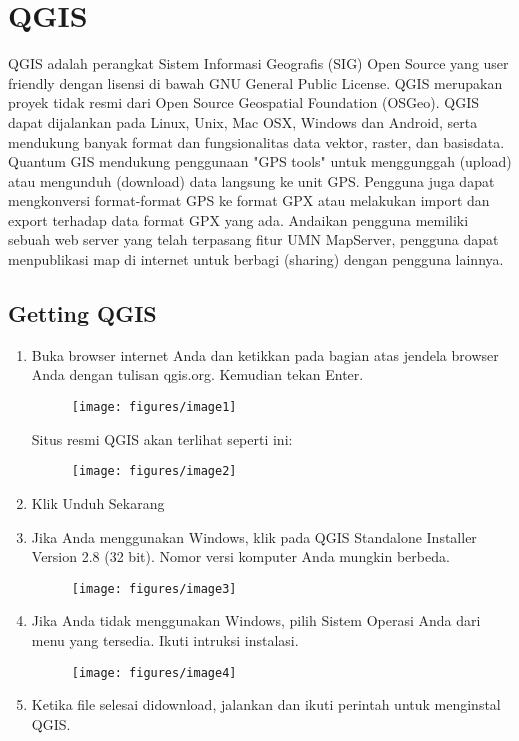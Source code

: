 \section{QGIS}
QGIS adalah perangkat Sistem Informasi Geografis (SIG) Open Source yang user friendly dengan lisensi di bawah GNU General Public License. QGIS merupakan proyek tidak resmi dari Open Source Geospatial Foundation (OSGeo). QGIS dapat dijalankan pada Linux, Unix, Mac OSX, Windows dan Android, serta mendukung banyak format dan fungsionalitas data vektor, raster, dan basisdata.
Quantum GIS mendukung penggunaan "GPS tools" untuk menggunggah (upload) atau mengunduh (download) data langsung ke unit GPS. Pengguna juga dapat mengkonversi format-format GPS ke format GPX atau melakukan import dan export terhadap data format GPX yang ada.
Andaikan pengguna memiliki sebuah web server yang telah terpasang fitur UMN MapServer, pengguna dapat menpublikasi map di internet untuk berbagi (sharing) dengan pengguna lainnya.


\subsection{Getting QGIS}
\begin{enumerate}
\item
Buka browser internet Anda dan ketikkan pada bagian atas jendela browser Anda dengan tulisan qgis.org. Kemudian tekan Enter.
\begin{figure}[ht]
	    \centerline{\texttt{[image: figures/image1]}}
	    \end{figure}

Situs resmi QGIS akan terlihat seperti ini:
\begin{figure}[ht]
	    \centerline{\texttt{[image: figures/image2]}}
	    \end{figure}
\item
Klik Unduh Sekarang
\item
Jika Anda menggunakan Windows, klik pada QGIS Standalone Installer Version 2.8 (32 bit). Nomor versi komputer Anda mungkin berbeda.
\begin{figure}[ht]
	    \centerline{\texttt{[image: figures/image3]}}
	    \end{figure}
\item
Jika Anda tidak menggunakan Windows, pilih Sistem Operasi Anda dari menu yang tersedia. Ikuti intruksi instalasi.
\begin{figure}[ht]
	    \centerline{\texttt{[image: figures/image4]}}
	    \end{figure}
\item
Ketika file selesai didownload, jalankan dan ikuti perintah untuk menginstal QGIS.

\end{enumerate}
